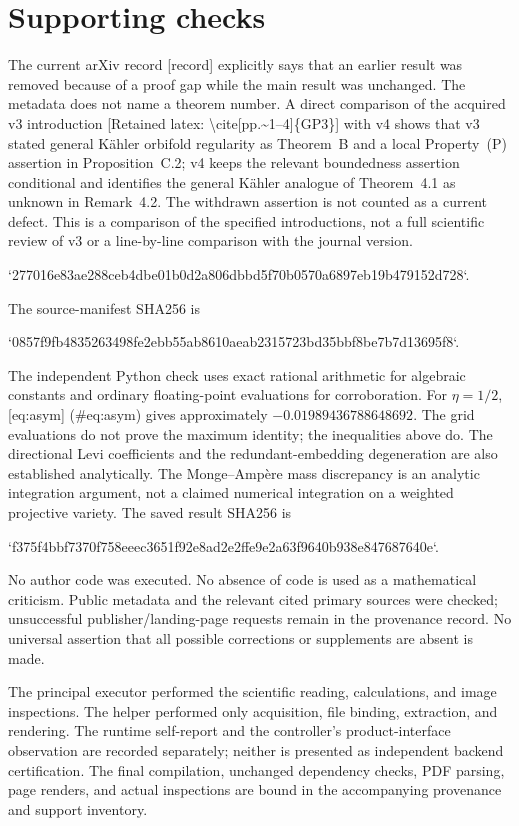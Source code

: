 \documentclass[10pt]{article}
\begin{document}
\section*{Supporting checks}
The current arXiv record [record] explicitly says that an earlier result was removed because of a proof gap while the main result was unchanged. The metadata does not name a theorem number. A direct comparison of the acquired v3 introduction [Retained latex: \textbackslash{}cite[pp.\textasciitilde{}1--4]\{GP3\}] with v4 shows that v3 stated general Kähler orbifold regularity as Theorem B and a local Property (P) assertion in Proposition C.2; v4 keeps the relevant boundedness assertion conditional and identifies the general Kähler analogue of Theorem 4.1 as unknown in Remark 4.2. The withdrawn assertion is not counted as a current defect. This is a comparison of the specified introductions, not a full scientific review of v3 or a line-by-line comparison with the journal version.\par
`277016e83ae288ceb4dbe01b0d2a806dbbd5f70b0570a6897eb19b479152d728`.\par
The source-manifest SHA256 is\par
`0857f9fb4835263498fe2ebb55ab8610aeab2315723bd35bbf8be7b7d13695f8`.\par
The independent Python check uses exact rational arithmetic for algebraic constants and ordinary floating-point evaluations for corroboration. For \(\eta=1/2\), [eq:asym] (\#eq:asym) gives approximately \(-0.01989436788648692\). The grid evaluations do not prove the maximum identity; the inequalities above do. The directional Levi coefficients and the redundant-embedding degeneration are also established analytically. The Monge–Ampère mass discrepancy is an analytic integration argument, not a claimed numerical integration on a weighted projective variety. The saved result SHA256 is\par
`f375f4bbf7370f758eeec3651f92e8ad2e2ffe9e2a63f9640b938e847687640e`.\par
No author code was executed. No absence of code is used as a mathematical criticism. Public metadata and the relevant cited primary sources were checked; unsuccessful publisher/landing-page requests remain in the provenance record. No universal assertion that all possible corrections or supplements are absent is made.\par
The principal executor performed the scientific reading, calculations, and image inspections. The helper performed only acquisition, file binding, extraction, and rendering. The runtime self-report and the controller’s product-interface observation are recorded separately; neither is presented as independent backend certification. The final compilation, unchanged dependency checks, PDF parsing, page renders, and actual inspections are bound in the accompanying provenance and support inventory.\par
\end{document}
